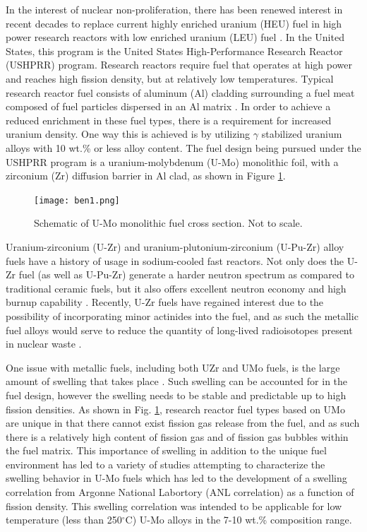 \documentclass[review]{elsarticle}
\begin{document}
In the interest of nuclear non-proliferation, there has been renewed interest in recent decades to replace current highly enriched uranium (HEU) fuel in high power research reactors with low enriched uranium (LEU) fuel \cite{snelgrove1997}. In the United States, this program is the United States High-Performance Research Reactor (USHPRR) program. Research reactors require fuel that operates at high power and reaches high fission density, but at relatively low temperatures. Typical research reactor fuel consists of aluminum (Al) cladding surrounding a fuel meat composed of fuel particles dispersed in an Al matrix \cite{meyer2014}. In order to achieve a reduced enrichment in these fuel types, there is a requirement for increased uranium density. One way this is achieved is by utilizing $\gamma$ stabilized uranium alloys with 10 wt.\% or less alloy content. The fuel design being pursued under the USHPRR program is a uranium-molybdenum (U-Mo) monolithic foil, with a zirconium (Zr) diffusion barrier in Al clad, as shown in Figure \ref{fig:ben1}. 

\begin{figure}[!h]
 \centering
 \texttt{[image: ben1.png]} 
 \caption{Schematic of U-Mo monolithic fuel cross section. Not to scale.}
 \label{fig:ben1}
\end{figure}

\FloatBarrier

Uranium-zirconium (U-Zr) and uranium-plutonium-zirconium (U-Pu-Zr) alloy fuels have a history of usage in sodium-cooled fast reactors. Not only does the U-Zr fuel (as well as U-Pu-Zr) generate a harder neutron spectrum as compared to traditional ceramic fuels, but it also offers excellent neutron economy and high burnup capability \cite{hofman1997}. Recently, U-Zr fuels have regained interest due to the possibility of incorporating minor actinides into the fuel, and as such the metallic fuel alloys would serve to reduce the quantity of long-lived radioisotopes present in nuclear waste \cite{capriotti2017}. 

One issue with metallic fuels, including both UZr and UMo fuels, is the large amount of swelling that takes place \cite{hofman1997}. Such swelling can be accounted for in the fuel design, however the swelling needs to be stable and predictable up to high fission densities. As shown in Fig. \ref{fig:ben1}, research reactor fuel types based on UMo are unique in that there cannot exist fission gas release from the fuel, and as such there is a relatively high content of fission gas and of fission gas bubbles within the fuel matrix. This importance of swelling in addition to the unique fuel environment has led to a variety of studies attempting to characterize the swelling behavior in U-Mo fuels \cite{rest2009, kim_anl08, meyer2002, kim2013} which has led to the development of a swelling correlation from Argonne National Labortory (ANL correlation) \cite{kim2011} as a function of fission density. This swelling correlation was intended to be applicable for low temperature (less than 250$^{\circ}$C) U-Mo alloys in the 7-10 wt.\% composition range. 
\end{document}
